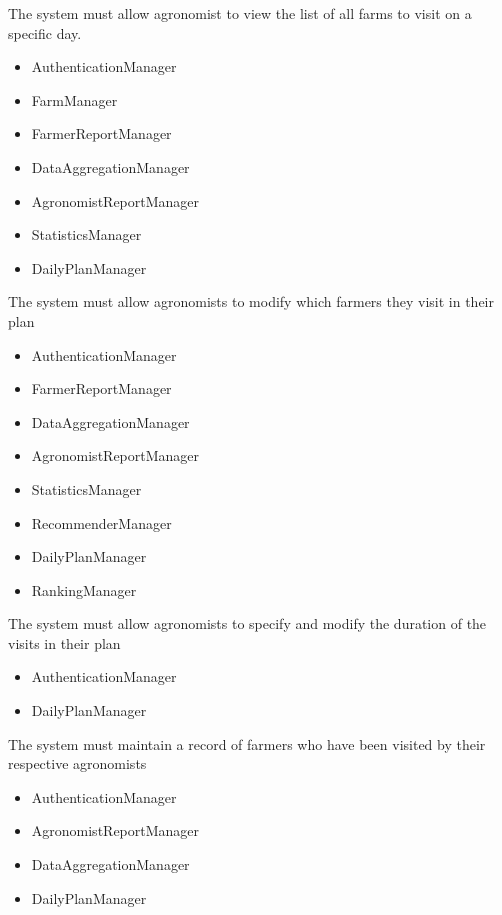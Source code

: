 \begin{itemize}
\begin{itemize}
\end{itemize}
  The system must allow agronomist to view the list of all farms to visit on a specific day.
\begin{itemize}

\item AuthenticationManager
\item FarmManager
\item FarmerReportManager
\item DataAggregationManager
\item AgronomistReportManager
\item StatisticsManager
\item DailyPlanManager


\end{itemize}
  The system must allow agronomists to modify which farmers they visit in their plan
\begin{itemize}

\item AuthenticationManager
\item FarmerReportManager
\item DataAggregationManager
\item AgronomistReportManager
\item StatisticsManager
\item RecommenderManager
\item DailyPlanManager
\item RankingManager

\end{itemize}

  The system must allow agronomists to specify and modify the duration of the visits in their plan
\begin{itemize}

\item AuthenticationManager
\item DailyPlanManager

\end{itemize}
  The system must maintain a record of farmers who have been visited by their respective agronomists
\begin{itemize}

\item AuthenticationManager
\item AgronomistReportManager
\item DataAggregationManager
\item DailyPlanManager


\end{itemize}
\end{itemize}
